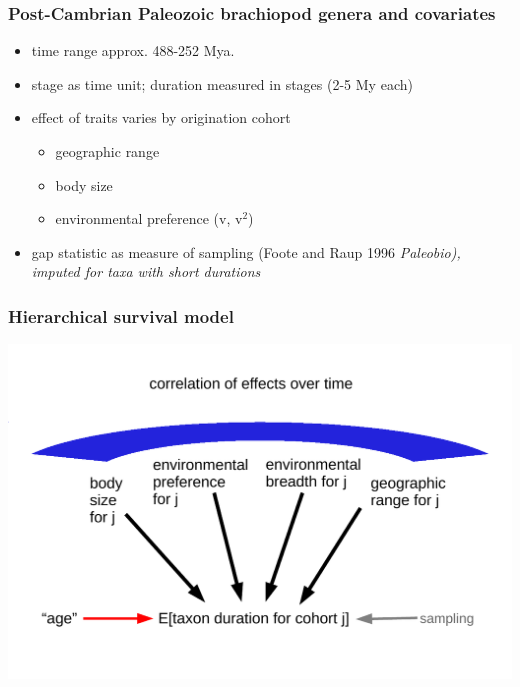 \documentclass{beamer}
\begin{document}
\begin{frame}
  \frametitle{Post-Cambrian Paleozoic brachiopod genera and covariates}
  \begin{itemize}
    \item time range approx. 488-252 Mya.
    \item stage as time unit; duration measured in stages (2-5 My each)
    \item effect of traits varies by origination cohort
      \begin{itemize}
        \item geographic range
        \item body size
        \item environmental preference (v, v\(^2\))
      \end{itemize}
    \item gap statistic as measure of sampling (Foote and Raup 1996 \em{Paleobio}), imputed for taxa with short durations
  \end{itemize}
\end{frame}

\begin{frame}
  \frametitle{Hierarchical survival model}
  \begin{center}
    \includegraphics[width = \textwidth,height = 0.8\textheight,keepaspectratio = true]{figure/simple_model}
  \end{center}
\end{frame}
\end{document}
